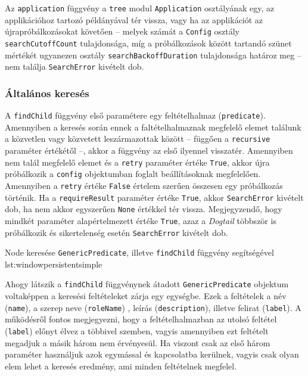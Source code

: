 Az \texttt{application} függvény a \texttt{tree} modul \texttt{Application} osztályának egy, az applikációhoz tartozó példányával tér vissza, vagy ha az applikációt az újrapróbálkozásokat követően -- melyek számát a \texttt{Config} osztály \texttt{searchCutoffCount} tulajdonsága, míg a próbálkozások között tartandó szünet mértékét ugyanezen osztály \texttt{searchBackoffDuration} tulajdonsága határoz meg -- nem találja \texttt{SearchError} kivételt dob.

\subsubsection{Általános keresés}

A \texttt{findChild} függvény első paramétere egy feltételhalmaz (\texttt{predicate}). Amennyiben a keresés során ennek a faltételhalmaznak megfelelő elemet találunk a közvetlen vagy közvetett leszármazottak között -- függően a \texttt{recursive} paraméter értékétől --, akkor a függvény az első ilyennel visszatér. Amennyiben nem talál megfelelő elemet és a \texttt{retry} paraméter értéke \texttt{True}, akkor újra próbálkozik a \texttt{config} objektumban foglalt beállításoknak megfelelően. Amennyiben a \texttt{retry} értéke \texttt{False} értelem szerűen összesen egy próbálkozás történik. Ha a \texttt{requireResult} paraméter értéke \texttt{True}, akkor \texttt{SearchError} kivételt dob, ha nem akkor egyszerűen \texttt{None} értékkel tér vissza. Megjegyzendő, hogy mindkét paraméter alapértelmezett értéke \texttt{True}, azaz a \textit{Dogtail} többször is próbálkozik és sikertelenség esetén \texttt{SearchError} kivételt dob.

{Node keresése \texttt{GenericPredicate}, illetve \texttt{findChild} függvény segítségével}
{lst:windowpersistentsimple}

Ahogy látszik a \texttt{findChild} függvénynek átadott \texttt{GenericPredicate} objektum voltaképpen a keresési feltételeket zárja egy egységbe. Ezek a feltételek a név (\texttt{name}), a szerep neve (\texttt{roleName}) , leírás (\texttt{description}), illetve felirat (\texttt{label}). A működésről fontos megjegyezni, hogy a feltételhalmazban az utolsó feltétel (\texttt{label}) előnyt élvez a többivel szemben, vagyis amennyiben ezt feltételt megadjuk a másik három nem érvényesül. Ha viszont csak az első három paraméter használjuk azok egymással és kapcsolatba kerülnek, vagyis csak olyan elem lehet a keresés eredmény, ami minden feltételnek megfelel.

